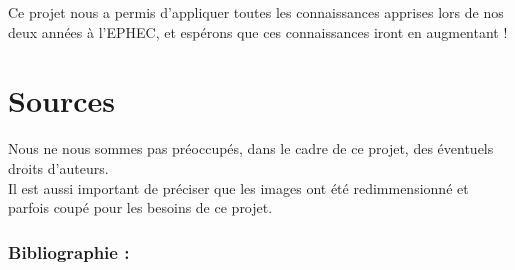 \documentclass[a4paper,titlepage]{article}
\begin{document}
	Ce projet nous a permis d'appliquer toutes les connaissances apprises lors de nos deux années à l'EPHEC, et espérons que ces connaissances iront en augmentant !
	
	\clearpage
	\section*{Sources }
\danger Nous ne nous sommes pas préoccupés, dans le cadre de ce projet, des éventuels droits d'auteurs.\\

Il est aussi important de préciser que les images ont été redimmensionné et parfois coupé pour les besoins de ce projet.	
	
\subsubsection*{Bibliographie :}
\end{document}
